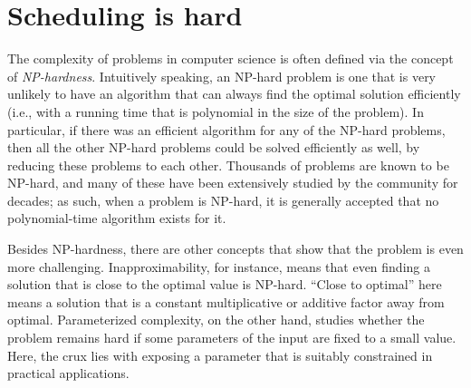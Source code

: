 \documentclass[oneside,reqno, a4paper]{amsart}
\numberwithin{equation}{section}
\let\Oldsection\section
\renewcommand{\section}{\FloatBarrier\Oldsection}
\begin{document}


\section{Scheduling is hard}
\label{sec:scheduling-is-hard}

The complexity of problems in computer science is often defined via the concept of \emph{NP-hardness}. Intuitively speaking, an NP-hard problem is one that is very unlikely to have an algorithm that can always find the optimal solution efficiently (i.e., with a running time that is polynomial in the size of the problem). In particular, if there was an efficient algorithm for any of the NP-hard problems, then all the other NP-hard problems could be solved efficiently as well, by reducing these problems to each other. Thousands of problems are known to be NP-hard, and many of these have been extensively studied by the community for decades; as such, when a problem is NP-hard, it is generally accepted that no polynomial-time algorithm exists for it.

Besides NP-hardness, there are other concepts that show that the problem is even more challenging. Inapproximability, for instance, means that even  finding a solution that is close to the optimal value is NP-hard. ``Close to optimal'' here means a solution that is a constant multiplicative or additive factor away from optimal. Parameterized complexity, on the other hand, studies whether the problem remains hard if some parameters of the input are fixed to a small value. Here, the crux lies with exposing a parameter that is suitably constrained in practical applications.
\end{document}
